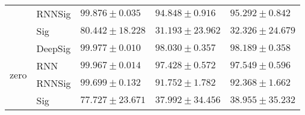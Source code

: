 \begin{tabular}{lllll}
                                 & RNNSig  &                           $ 99.876 \pm 0.035 $ &                           $ 94.848 \pm 0.916 $ &                           $ 95.292 \pm 0.842 $ \\
                                 & Sig     &                          $ 80.442 \pm 18.228 $ &                          $ 31.193 \pm 23.962 $ &                          $ 32.326 \pm 24.679 $ \\
\midrule
\multirow{4}{*}{zero}            & DeepSig &               $  \mathbf{ 99.977 \pm 0.010 } $ &                           $ 98.030 \pm 0.357 $ &                           $ 98.189 \pm 0.358 $ \\
                                 & RNN     &                           $ 99.967 \pm 0.014 $ &                           $ 97.428 \pm 0.572 $ &                           $ 97.549 \pm 0.596 $ \\
                                 & RNNSig  &                           $ 99.699 \pm 0.132 $ &                           $ 91.752 \pm 1.782 $ &                           $ 92.368 \pm 1.662 $ \\
                                 & Sig     &                          $ 77.727 \pm 23.671 $ &                          $ 37.992 \pm 34.456 $ &                          $ 38.955 \pm 35.232 $ \\
\bottomrule
\end{tabular}
